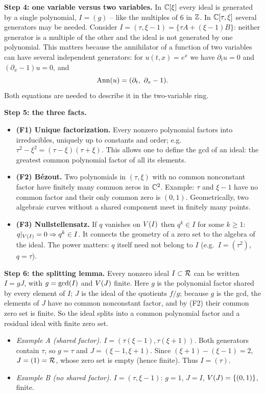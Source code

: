 \medskip\textbf{Step 4: one variable versus two variables.} In $\mathbb{C}[\xi]$ every ideal is generated by a single polynomial, $I=(g)$ -- like the multiples of $6$ in $\mathbb{Z}$. In $\mathbb{C}[\tau,\xi]$ several generators may be needed. Consider $I=(\tau,\xi-1)=\{\tau A+(\xi-1)B\}$: neither generator is a multiple of the other and the ideal is not generated by one polynomial. This matters because the annihilator of a function of two variables can have several independent generators: for $u(t,x)=e^x$ we have $\partial_tu=0$ and $(\partial_x-1)u=0$, and
\[
\Ann(u)=(\partial_t,\ \partial_x-1).
\]
Both equations are needed to describe it in the two-variable ring.

\medskip\textbf{Step 5: the three facts.}
\begin{itemize}[nosep]
\item \textbf{(F1) Unique factorization.} Every nonzero polynomial factors into irreducibles, uniquely up to constants and order; e.g.\ $\tau^2-\xi^2=(\tau-\xi)(\tau+\xi)$. This allows one to define the gcd of an ideal: the greatest common polynomial factor of all its elements.
\item \textbf{(F2) B\'ezout.} Two polynomials in $(\tau,\xi)$ with no common nonconstant factor have finitely many common zeros in $\mathbb{C}^2$. Example: $\tau$ and $\xi-1$ have no common factor and their only common zero is $(0,1)$. Geometrically, two algebraic curves without a shared component meet in finitely many points.
\item \textbf{(F3) Nullstellensatz.} If $q$ vanishes on $V(I)$ then $q^k\in I$ for some $k\ge1$: $q|_{V(I)}=0\Rightarrow q^k\in I$. It connects the geometry of a zero set to the algebra of the ideal. The power matters: $q$ itself need not belong to $I$ (e.g.\ $I=(\tau^2)$, $q=\tau$).
\end{itemize}

\medskip\textbf{Step 6: the splitting lemma.} Every nonzero ideal $I\subset\mathcal{R}$ can be written $I=gJ$, with $g=\operatorname{gcd}(I)$ and $V(J)$ finite. Here $g$ is the polynomial factor shared by every element of $I$; $J$ is the ideal of the quotients $f/g$; because $g$ is the gcd, the elements of $J$ have no common nonconstant factor, and by (F2) their common zero set is finite. So the ideal splits into a common polynomial factor and a residual ideal with finite zero set.
\begin{itemize}[nosep]
\item \emph{Example A (shared factor).} $I=(\tau(\xi-1),\tau(\xi+1))$. Both generators contain $\tau$, so $g=\tau$ and $J=(\xi-1,\xi+1)$. Since $(\xi+1)-(\xi-1)=2$, $J=(1)=\mathcal{R}$, whose zero set is empty (hence finite). Thus $I=(\tau)$.
\item \emph{Example B (no shared factor).} $I=(\tau,\xi-1)$: $g=1$, $J=I$, $V(J)=\{(0,1)\}$, finite.
\end{itemize}

